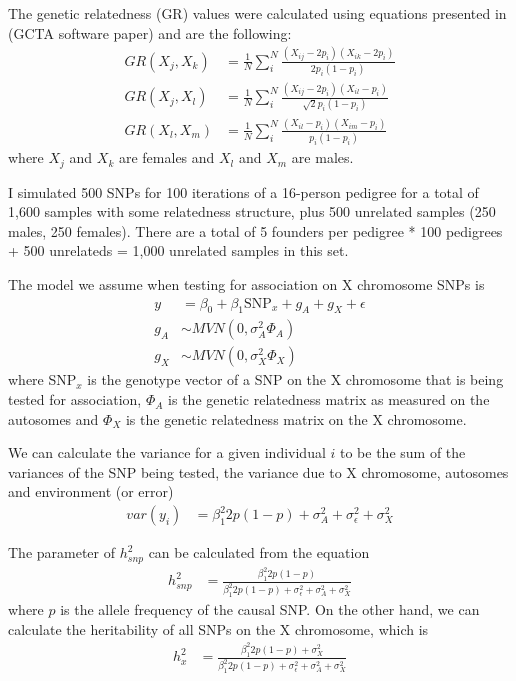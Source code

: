 \documentclass[11pt]{article} %
\begin{document}
\newpage
The genetic relatedness (GR) values were calculated using equations presented in (GCTA software paper) and are the following:
\begin{align}
GR(X_j,X_k)&=\frac{1}{N}\sum^N_i \frac{(X_{ij}-2p_i)(X_{ik}-2p_i)}{2p_i(1-p_i)} \\
GR(X_j,X_l)&=\frac{1}{N}\sum^N_i \frac{(X_{ij}-2p_i)(X_{il}-p_i)}{\sqrt{2}p_i(1-p_i)}\\
GR(X_l,X_m)&=\frac{1}{N}\sum^N_i \frac{(X_{il}-p_i)(X_{im}-p_i)}{p_i(1-p_i)}
\end{align}
where $X_j$ and $X_k$ are females and $X_l$ and $X_m$ are males.


\newpage
I simulated 500 SNPs for 100 iterations of a 16-person pedigree for a total of 1,600 samples with some relatedness structure, plus 500 unrelated samples (250 males, 250 females). 
There are a total of 5 founders per pedigree * 100 pedigrees + 500 unrelateds = 1,000 unrelated samples in this set.

The model we assume when testing for association on X chromosome SNPs is 
\begin{align}
y &= \beta_0 + \beta_1 \mbox{SNP}_x + g_A + g_X +\epsilon \\
g_A &\sim MVN(0,\sigma^2_A \Phi_A) \\
g_X &\sim MVN(0,\sigma^2_X \Phi_X) 
\end{align}
where SNP$_x$ is the genotype vector of a SNP on the X chromosome that is being tested for association, $\Phi_A$ is the genetic relatedness matrix as measured on the autosomes and $\Phi_X$ is the genetic relatedness matrix on the X chromosome.

We can calculate the variance for a given individual $i$ to be the sum of the variances of the SNP being tested, the variance due to X chromosome, autosomes and environment (or error)
\begin{align}
var(y_i)&=\beta_1^2 2p(1-p)+\sigma^2_A +\sigma^2_\epsilon + \sigma^2_X
\end{align}

The parameter of $h^2_{snp}$ can be calculated from the equation
\begin{align}
h^2_{snp}&=\frac{\beta_1^2 2p(1-p)}{\beta_1^2 2p(1-p)+\sigma^2_\epsilon + \sigma^2_A + \sigma^2_X}
\end{align}
where $p$ is the allele frequency of the causal SNP.
On the other hand, we can calculate the heritability of all SNPs on the X chromosome, which is 
\begin{align}
h^2_{x}&=\frac{\beta_1^2 2p(1-p)+\sigma^2_X}{\beta_1^2 2p(1-p)+\sigma^2_\epsilon + \sigma^2_A + \sigma^2_X}
\end{align}
\end{document}

